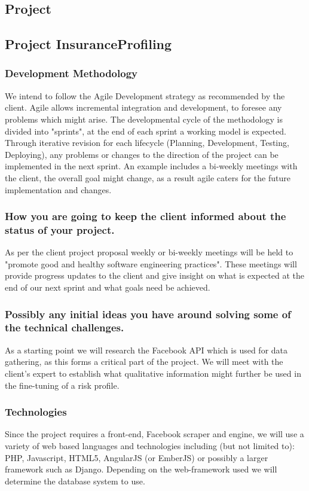 \documentclass{article}
\begin{document}
	\subsection{Project }
	\subsection{Project InsuranceProfiling}
	\subsubsection{Development Methodology}
	We intend to follow the Agile Development strategy as recommended by the client. Agile allows incremental integration and development, to foresee any problems which might arise. The developmental cycle of the methodology is divided into "sprints", at the end of each sprint a working model is expected. Through iterative revision for each lifecycle (Planning, Development, Testing, Deploying), any problems or changes to the direction of the project can be implemented in the next sprint. An example includes a bi-weekly meetings with the client, the overall goal might change, as a result agile caters for the future implementation and changes.
	
	\subsubsection{How you are going to keep the client informed about the status of your project.}
	As per the client project proposal weekly or bi-weekly meetings will be held to "promote good and
healthy software engineering practices". These meetings will provide progress updates to the client and give insight on what is expected at the end of our next sprint and what goals need be achieved. 
	
	\subsubsection{Possibly any initial ideas you have around solving some of the technical challenges.}
	As a starting point we will research the Facebook API which is used for data gathering, as this forms a critical part of the project. We will meet with the client's expert to establish what qualitative information might further be used in the fine-tuning of a risk profile.
	
	\subsubsection{Technologies}
	Since the project requires a front-end, Facebook scraper and engine, we will use a variety of web based languages and technologies including (but not limited to): PHP, Javascript, HTML5, AngularJS (or EmberJS) or possibly a larger framework such as Django. Depending on the web-framework used we will determine the database system to use. 
	
\end{document}
